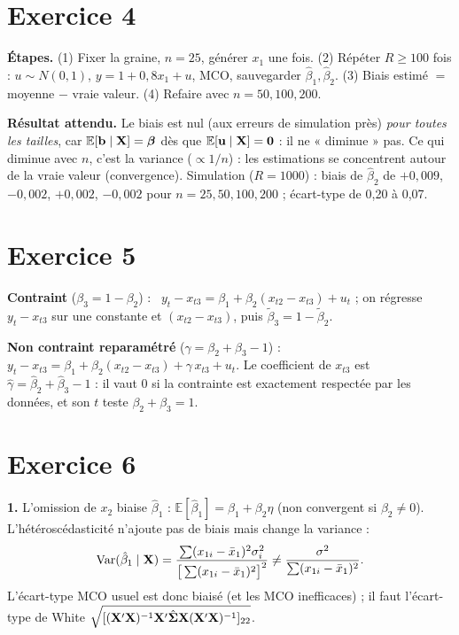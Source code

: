 \documentclass[11pt,a4paper]{article}
\newcommand{\vbeta}{\bm{\beta}}\newcommand{\vgamma}{\bm{\gamma}}\newcommand{\veps}{\bm{\epsilon}}
\newcommand{\E}{\mathbb{E}}\newcommand{\Var}{\operatorname{Var}}\newcommand{\Cov}{\operatorname{Cov}}
\begin{document}
\section*{Exercice 4}

\textbf{Étapes.} (1) Fixer la graine, $n=25$, générer $x_1$ une fois. (2) Répéter $R\ge100$ fois : $u\sim N(0,1)$, $y=1+0{,}8x_1+u$, MCO, sauvegarder $\hat\beta_1,\hat\beta_2$. (3) Biais estimé $=$ moyenne $-$ vraie valeur. (4) Refaire avec $n=50,100,200$.

\textbf{Résultat attendu.} Le biais est nul (aux erreurs de simulation près) \emph{pour toutes les tailles}, car $\E[\vb\mid\vX]=\vbeta$ dès que $\E[\vu\mid\vX]=\mathbf 0$ : il ne « diminue » pas. Ce qui diminue avec $n$, c'est la variance ($\propto1/n$) : les estimations se concentrent autour de la vraie valeur (convergence). Simulation ($R=1000$) : biais de $\hat\beta_2$ de $+0{,}009$, $-0{,}002$, $+0{,}002$, $-0{,}002$ pour $n=25,50,100,200$ ; écart-type de 0,20 à 0,07.

\section*{Exercice 5}

\textbf{Contraint} ($\beta_3=1-\beta_2$) : \ $y_t-x_{t3}=\beta_1+\beta_2(x_{t2}-x_{t3})+u_t$ ; on régresse $y_t-x_{t3}$ sur une constante et $(x_{t2}-x_{t3})$, puis $\tilde\beta_3=1-\tilde\beta_2$.

\textbf{Non contraint reparamétré} ($\gamma=\beta_2+\beta_3-1$) : \ $y_t-x_{t3}=\beta_1+\beta_2(x_{t2}-x_{t3})+\gamma\,x_{t3}+u_t$. Le coefficient de $x_{t3}$ est $\hat\gamma=\hat\beta_2+\hat\beta_3-1$ : il vaut 0 si la contrainte est exactement respectée par les données, et son $t$ teste $\beta_2+\beta_3=1$.

\section*{Exercice 6}

\textbf{1.} L'omission de $x_2$ biaise $\hat\beta_1$ : $\E[\hat\beta_1]=\beta_1+\beta_2\eta$ (non convergent si $\beta_2\neq0$). L'hétéroscédasticité n'ajoute pas de biais mais change la variance :
\[
\Var(\hat\beta_1\mid\vX)=\frac{\sum(x_{1i}-\bar x_1)^2\sigma_i^2}{\big[\sum(x_{1i}-\bar x_1)^2\big]^2}\neq\frac{\sigma^2}{\sum(x_{1i}-\bar x_1)^2}.
\]
L'écart-type MCO usuel est donc biaisé (et les MCO inefficaces) ; il faut l'écart-type de White $\sqrt{[(\mathbf{X}'\mathbf{X})^{-1}\mathbf{X}'\hat{\bm\Sigma}\mathbf{X}(\mathbf{X}'\mathbf{X})^{-1}]_{22}}$.
\end{document}
